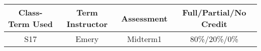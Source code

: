 \begin{outcomes}
\begin{center}
	\begin{tabular}{cccc}
		\hline\hline
		Class-Term Used & Term Instructor & Assessment & Full/Partial/No Credit \\
		\hline
		S17 & Emery & Midterm1 & 80\%/20\%/0\%\\    %
		\hline
	\end{tabular}
\end{center}
\end{outcomes}

\begin{comments}


\end{comments}